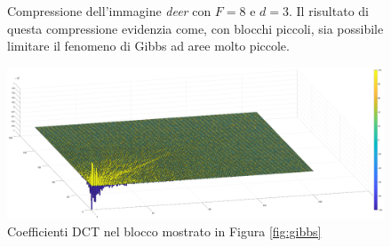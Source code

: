 \begin{figure}%
	\centering
	\caption{Compressione dell'immagine \textit{deer} con $F=8$ e $d=3$. Il risultato di questa compressione evidenzia come, con blocchi piccoli, sia possibile limitare il fenomeno di Gibbs ad aree molto piccole.}%
	\label{fig:gibbs_small}
\end{figure}

\begin{figure}
	\centering
	\includegraphics[width=1\linewidth]{figures/dct_values_3d.eps}
	\caption{Coefficienti DCT nel blocco mostrato in Figura \ref{fig:gibbs}}
	\label{fig:dct_values_on_gibbs}
\end{figure}

